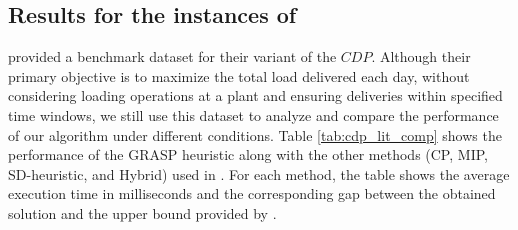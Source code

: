 \subsection{Results for the instances of \cite{kinable2014concrete}}

\cite{kinable2014concrete} provided a benchmark dataset for their variant of the $CDP$. Although their primary objective is to maximize the total load delivered each day, without considering loading operations at a plant and ensuring deliveries within specified time windows, we still use this dataset to analyze and compare the performance of our algorithm under different conditions. Table \ref{tab:cdp_lit_comp} shows the performance of the GRASP heuristic along with the other methods (CP, MIP, SD-heuristic, and Hybrid) used in \cite{kinable2014concrete}.  For each method, the table shows the average execution time in milliseconds and the corresponding gap between the obtained solution and the upper bound provided by \cite{kinable2014concrete}.

